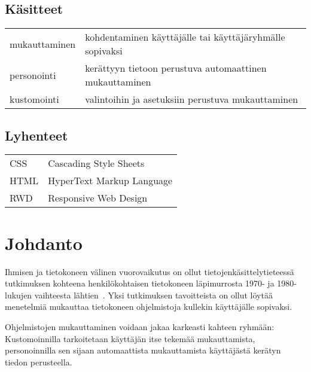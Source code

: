 \documentclass[finnish, 12pt, a4paper, elec, utf8, a-1b, online]{aaltothesis}
\date{xx.xx.2022}
\begin{document}
\makecoverpage{}

\makecopyrightpage{}

\begin{abstractpage}[finnish]
\end{abstractpage}

\thesistableofcontents{}


\subsection*{Käsitteet}

\begin{tabular}{ll}
mukauttaminen & kohdentaminen käyttäjälle tai käyttäjäryhmälle sopivaksi \\
personointi & kerättyyn tietoon perustuva automaattinen mukauttaminen \\
kustomointi & valintoihin ja asetuksiin perustuva mukauttaminen
\end{tabular}

\subsection*{Lyhenteet}

\begin{tabular}{ll}
CSS & Cascading Style Sheets \\
HTML & HyperText Markup Language \\
RWD & Responsive Web Design
\end{tabular}

\cleardoublepage{}

\section{Johdanto}

Ihmisen ja tietokoneen välinen vuorovaikutus on ollut tietojenkäsittelytieteessä
tutkimuksen kohteena henkilökohtaisen tietokoneen läpimurrosta 1970- ja
1980-lukujen vaihteesta lähtien~\cite{10.1145/800178.810088}. Yksi tutkimuksen
tavoitteista on ollut löytää menetelmiä mukauttaa tietokoneen ohjelmistoja
kullekin käyttäjälle sopivaksi.

Ohjelmistojen mukauttaminen voidaan jakaa karkeasti kahteen ryhmään:
Kustomoinnilla tarkoitetaan käyttäjän itse tekemää mukauttamista, personoinnilla
sen sijaan automaattista mukauttamista käyttäjästä kerätyn tiedon
perusteella.~\cite{10.1108/03090560710737534}
\end{document}
